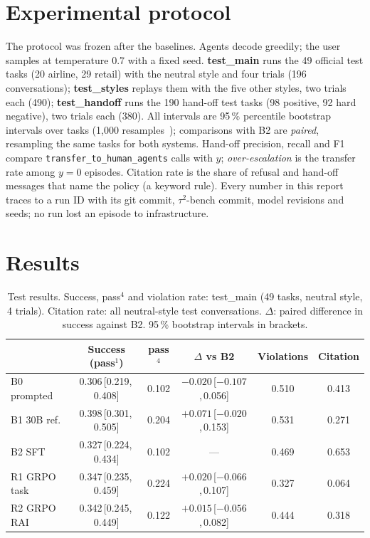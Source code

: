 \documentclass[12pt,a4paper]{article}
\newcommand{\tautwo}{$\tau^2$-bench}
\newcommand{\passk}[1]{pass$^{#1}$}
\newcommand{\ci}[2]{\,[#1,\,#2]}
\begin{document}
\section{Experimental protocol}

The protocol was frozen after the baselines. Agents decode greedily; the user
samples at temperature 0.7 with a fixed seed. \textbf{test\_main} runs the 49
official test tasks (20 airline, 29 retail) with the neutral style and four
trials (196 conversations); \textbf{test\_styles} replays them with the five
other styles, two trials each (490); \textbf{test\_handoff} runs the 190
hand-off test tasks (98 positive, 92 hard negative), two trials each (380).
All intervals are 95\,\% percentile bootstrap intervals over tasks (1,000
resamples~\cite{efron1993}); comparisons with B2 are \emph{paired}, resampling
the same tasks for both systems. Hand-off precision, recall and F1 compare
\texttt{transfer\_to\_human\_agents} calls with $y$;
\emph{over-escalation} is the transfer rate among $y{=}0$ episodes. Citation
rate is the share of refusal and hand-off messages that name the policy
(a keyword rule). Every number in this report traces to a run ID with its
git commit, \tautwo{} commit, model revisions and seeds; no run lost an
episode to infrastructure.

\section{Results}

\begin{table}[t]
\centering
\caption{Test results. Success, \passk{4} and violation rate: test\_main
(49 tasks, neutral style, 4 trials). Citation rate: all neutral-style test
conversations. $\Delta$: paired difference in success against B2. 95\,\%
bootstrap intervals in brackets.}
\label{tab:main}
\small
\setlength{\tabcolsep}{4pt}
\begin{tabular}{lccccc}
\toprule
 & Success (\passk{1}) & \passk{4} & $\Delta$ vs B2 & Violations & Citation\\
\midrule
B0 prompted & 0.306\ci{0.219}{0.408} & 0.102 & $-0.020$\ci{$-0.107$}{0.056} & 0.510 & 0.413\\
B1 30B ref. & 0.398\ci{0.301}{0.505} & 0.204 & $+0.071$\ci{$-0.020$}{0.153} & 0.531 & 0.271\\
B2 SFT          & 0.327\ci{0.224}{0.434} & 0.102 & --- & 0.469 & 0.653\\
R1 GRPO task & 0.347\ci{0.235}{0.459} & 0.224 & $+0.020$\ci{$-0.066$}{0.107} & 0.327 & 0.064\\
R2 GRPO RAI & 0.342\ci{0.245}{0.449} & 0.122 & $+0.015$\ci{$-0.056$}{0.082} & 0.444 & 0.318\\
\bottomrule
\end{tabular}
\end{table}
\end{document}
